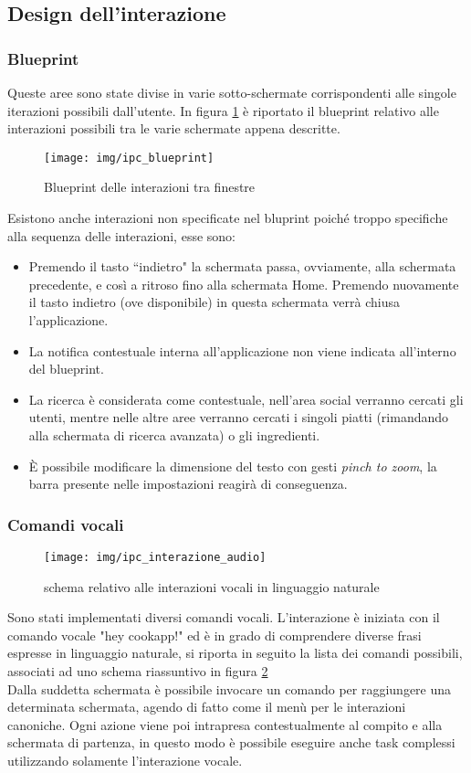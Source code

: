 \subsection{Design dell'interazione}

\subsubsection{Blueprint}
Queste aree sono state divise in varie sotto-schermate corrispondenti alle
singole iterazioni possibili dall'utente.  In figura \ref{fig:blueprint}
è riportato il blueprint relativo alle interazioni possibili tra le varie schermate appena descritte.
\begin{figure}[H]
	\centering
	\caption{Blueprint delle interazioni tra finestre}
	\texttt{[image: img/ipc\_blueprint]}
	\label{fig:blueprint}
\end{figure}
Esistono anche interazioni non specificate nel bluprint poiché troppo specifiche
alla sequenza delle interazioni, esse sono:
\begin{itemize}
	\item Premendo il tasto ``indietro" la schermata passa, ovviamente, alla
	schermata precedente, e così a ritroso fino alla schermata Home.
	Premendo nuovamente il tasto indietro (ove disponibile) in questa
	schermata verrà chiusa l'applicazione.
	\item La notifica contestuale interna all'applicazione non viene
	indicata all'interno del blueprint.
	\item La ricerca è considerata come contestuale, nell'area social
	verranno cercati gli utenti, mentre nelle altre aree verranno cercati i
	singoli piatti (rimandando alla schermata di ricerca avanzata)
	o gli ingredienti.
	\item È possibile modificare la dimensione del testo con gesti \emph{pinch to
	zoom}, la barra presente nelle impostazioni reagirà di conseguenza.
\end{itemize}

\subsubsection{Comandi vocali}
\begin{figure}[H]
	\texttt{[image: img/ipc\_interazione\_audio]}
	\caption{schema relativo alle interazioni vocali in linguaggio naturale}
	\label{fig:ipcvocali}
\end{figure}
Sono stati implementati diversi comandi vocali.  L'interazione è iniziata
con il comando vocale "hey cookapp!" ed è in grado di comprendere diverse frasi
espresse in linguaggio naturale, si riporta in seguito la lista dei comandi
possibili, associati ad uno schema riassuntivo in figura \ref{fig:ipcvocali}\\
Dalla suddetta schermata è possibile invocare un comando per raggiungere una
determinata schermata, agendo di fatto come il menù per le interazioni
canoniche.  Ogni azione viene poi intrapresa contestualmente al compito e alla
schermata di partenza, in questo modo è possibile eseguire anche task complessi
utilizzando solamente l'interazione vocale.

